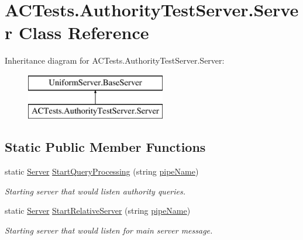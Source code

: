 \hypertarget{class_a_c_tests_1_1_authority_test_server_1_1_server}{}\section{A\+C\+Tests.\+Authority\+Test\+Server.\+Server Class Reference}
\label{class_a_c_tests_1_1_authority_test_server_1_1_server}
Inheritance diagram for A\+C\+Tests.\+Authority\+Test\+Server.\+Server\+:\begin{figure}[H]
\begin{center}
\leavevmode
\includegraphics[height=2.000000cm]{d7/d25/class_a_c_tests_1_1_authority_test_server_1_1_server}
\end{center}
\end{figure}
\subsection*{Static Public Member Functions}
\begin{DoxyCompactItemize}
\item 
static \mbox{\hyperlink{class_a_c_tests_1_1_authority_test_server_1_1_server}{Server}} \mbox{\hyperlink{class_a_c_tests_1_1_authority_test_server_1_1_server_adbad730368de7ce78c51eaafe5d2fedf}{Start\+Query\+Processing}} (string \mbox{\hyperlink{class_uniform_server_1_1_base_server_aaa318b3ed503dd8ccf381c9f3a81ecf2}{pipe\+Name}})
\begin{DoxyCompactList}\small\item\em Starting server that would listen authority queries. \end{DoxyCompactList}\item 
static \mbox{\hyperlink{class_a_c_tests_1_1_authority_test_server_1_1_server}{Server}} \mbox{\hyperlink{class_a_c_tests_1_1_authority_test_server_1_1_server_a2298541cb5cc5e979ebaed57e800661e}{Start\+Relative\+Server}} (string \mbox{\hyperlink{class_uniform_server_1_1_base_server_aaa318b3ed503dd8ccf381c9f3a81ecf2}{pipe\+Name}})
\begin{DoxyCompactList}\small\item\em Starting server that would listen for main server message. \end{DoxyCompactList}\end{DoxyCompactItemize}
